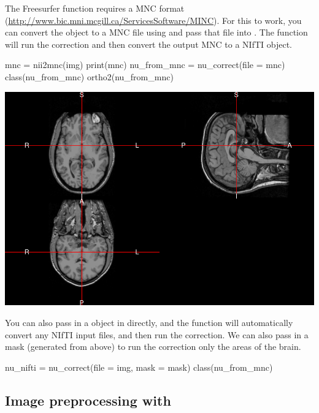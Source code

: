 The Freesurfer  function requires a MNC format
(\url{http://www.bic.mni.mcgill.ca/ServicesSoftware/MINC}). For this to
work, you can convert the  object to a MNC file using
 and pass that file into . The
  function will run the correction and
then convert the output MNC to a NIfTI object.

\begin{Schunk}
\begin{Sinput}
mnc = nii2mnc(img)
print(mnc)
nu_from_mnc = nu_correct(file = mnc)
class(nu_from_mnc)
ortho2(nu_from_mnc)
\end{Sinput}

\includegraphics{Freesurfer_files/figure-latex/nu_correct_mcn2nii-1} \end{Schunk}

You can also pass in a  object in directly, and the
  function will automatically convert
any NIfTI input files, and then run the correction. We can also pass in
a mask (generated from above) to run the correction only the areas of
the brain.

\begin{Schunk}
\begin{Sinput}
nu_nifti = nu_correct(file = img, mask = mask)
class(nu_from_mnc)
\end{Sinput}
\end{Schunk}

\subsection{Image preprocessing with }

